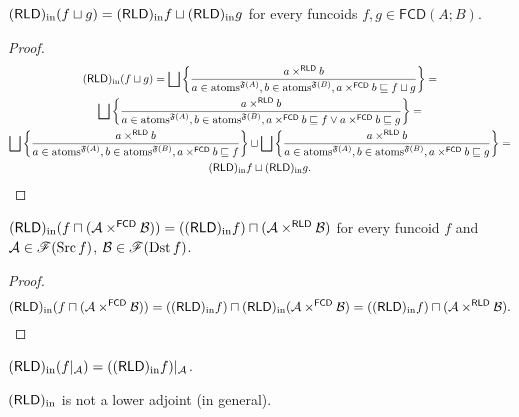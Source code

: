 \begin{thm}
$(\mathsf{RLD})_{\mathrm{in}}(f\sqcup g)=(\mathsf{RLD})_{\mathrm{in}} f\sqcup(\mathsf{RLD})_{\mathrm{in}} g$ for every funcoids
$f,g\in\mathsf{FCD}(A;B)$.\end{thm}
\begin{proof}
~
\begin{multline*}
(\mathsf{RLD})_{\mathrm{in}}(f\sqcup g)=\bigsqcup\left\{ \frac{a\times^{\mathsf{RLD}}b}{a\in\operatorname{atoms}^{\mathfrak{F}(A)},b\in\operatorname{atoms}^{\mathfrak{F}(B)},a\times^{\mathsf{FCD}}b\sqsubseteq f\sqcup g}\right\}=\\
\bigsqcup\left\{ \frac{a\times^{\mathsf{RLD}}b}{a\in\operatorname{atoms}^{\mathfrak{F}(A)},b\in\operatorname{atoms}^{\mathfrak{F}(B)},a\times^{\mathsf{FCD}}b\sqsubseteq f\vee a\times^{\mathsf{FCD}}b\sqsubseteq g}\right\}=\\
\bigsqcup\left\{ \frac{a\times^{\mathsf{RLD}}b}{a\in\operatorname{atoms}^{\mathfrak{F}(A)},b\in\operatorname{atoms}^{\mathfrak{F}(B)},a\times^{\mathsf{FCD}}b\sqsubseteq f}\right\}\sqcup\bigsqcup\left\{ \frac{a\times^{\mathsf{RLD}}b}{a\in\operatorname{atoms}^{\mathfrak{F}(A)},b\in\operatorname{atoms}^{\mathfrak{F}(B)},a\times^{\mathsf{FCD}}b\sqsubseteq g}\right\}=\\
(\mathsf{RLD})_{\mathrm{in}} f\sqcup(\mathsf{RLD})_{\mathrm{in}} g.
\end{multline*}
\end{proof}
\begin{prop}
$(\mathsf{RLD})_{\mathrm{in}}(f\sqcap(\mathcal{A}\times^{\mathsf{FCD}}\mathcal{B}))=((\mathsf{RLD})_{\mathrm{in}} f)\sqcap(\mathcal{A}\times^{\mathsf{RLD}}\mathcal{B})$
for every funcoid $f$ and $\mathcal{A}\in\mathscr{F}(\operatorname{Src} f)$, $\mathcal{B}\in\mathscr{F}(\operatorname{Dst} f)$.\end{prop}
\begin{proof}
~
\[
(\mathsf{RLD})_{\mathrm{in}}(f\sqcap(\mathcal{A}\times^{\mathsf{FCD}}\mathcal{B}))=((\mathsf{RLD})_{\mathrm{in}} f)\sqcap(\mathsf{RLD})_{\mathrm{in}}(\mathcal{A}\times^{\mathsf{FCD}}\mathcal{B})=((\mathsf{RLD})_{\mathrm{in}} f)\sqcap(\mathcal{A}\times^{\mathsf{RLD}}\mathcal{B}).
\]
\end{proof}
\begin{cor}
$(\mathsf{RLD})_{\mathrm{in}}(f|_{\mathcal{A}})=((\mathsf{RLD})_{\mathrm{in}} f)|_{\mathcal{A}}$.\end{cor}
\begin{conjecture}
$(\mathsf{RLD})_{\mathrm{in}}$ is not a lower adjoint (in general).
\end{conjecture}

